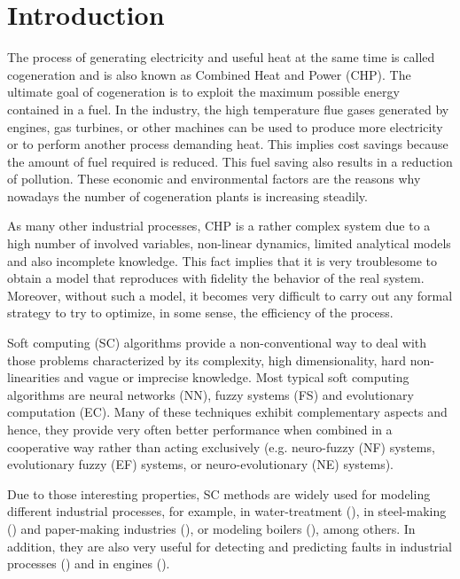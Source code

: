 \section{Introduction}
\label{intro}

The process of generating electricity and useful heat at the same time is called cogeneration and is also known as Combined Heat and Power (CHP). The ultimate goal of cogeneration is to exploit the maximum possible energy contained in a fuel. In the industry, the high temperature flue gases generated by engines, gas turbines, or other machines can be used to produce more electricity or to perform another process demanding heat. This implies cost savings because the amount of fuel required is reduced. This fuel saving also results in a reduction of pollution. These economic and environmental factors are the reasons why nowadays the number of cogeneration plants is increasing steadily. 

As many other industrial processes, CHP is a rather complex system due to a high number of involved variables, non-linear dynamics, limited analytical models and also incomplete knowledge. This fact implies that it is very troublesome to obtain a model that reproduces with fidelity the behavior of the real system. Moreover, without such a model, it becomes very difficult to carry out any formal strategy to try to optimize, in some sense, the efficiency of the process.

Soft computing (SC) algorithms provide a non-conventional way to deal with those problems characterized by its complexity, high dimensionality, hard non-linearities and vague or imprecise knowledge. Most typical soft computing algorithms are neural networks (NN), fuzzy systems (FS) and evolutionary computation (EC). Many of these techniques exhibit complementary  aspects and hence, they provide very often better performance when combined in a cooperative way rather than acting exclusively (e.g. neuro-fuzzy (NF) systems, evolutionary fuzzy (EF) systems, or neuro-evolutionary (NE) systems).

Due to those interesting properties, SC methods are widely used for modeling different industrial processes, for example, in water-treatment (\cite{Noshadi-2013}), in steel-making (\cite{Isazadeh-2012}) and paper-making industries (\cite{Zhang-2012}), or modeling boilers (\cite{Budnik-2012,Huang-2009}), among others. In addition, they are also very useful for detecting and predicting faults in industrial processes (\cite{Rakhshani-2009,Lemma-2013}) and in engines (\cite{Shatnawi-2014,Ghate-2011,Refaat-2013}). 

